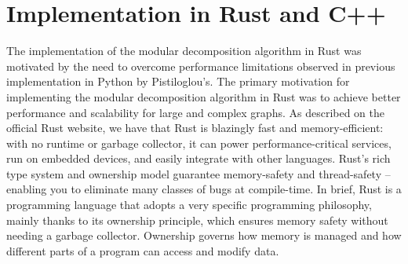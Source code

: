 

\chapter{Implementation in Rust and C++}\label{ch:implementation-in-rust-and-cpp}

The implementation of the modular decomposition algorithm in Rust was motivated by the need to overcome performance limitations observed in previous implementation in Python by Pistiloglou’s.
The primary motivation for implementing the modular decomposition algorithm in Rust was to achieve better performance and scalability for large and complex graphs.
As described on the official Rust website, we have that Rust is blazingly fast and memory-efficient: with no runtime or garbage collector, it can power performance-critical services, run on embedded devices, and easily integrate with other languages.
Rust's rich type system and ownership model guarantee memory-safety and thread-safety -- enabling you to eliminate many classes of bugs at compile-time.
In brief, Rust is a programming language that adopts a very specific programming philosophy, mainly thanks to its ownership principle, which ensures memory safety without needing a garbage collector.
Ownership governs how memory is managed and how different parts of a program can access and modify data.

